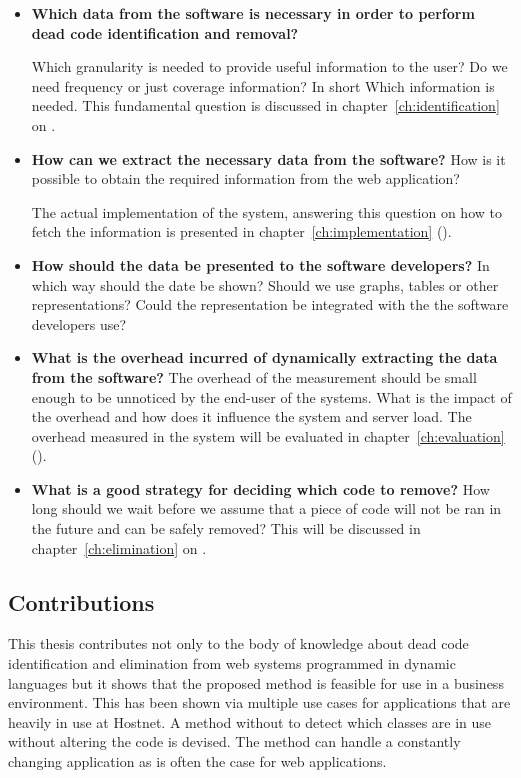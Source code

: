 \begin{itemize}
  \item 
  \textbf{Which data from the software is necessary in         order to perform dead code identification and removal?}  

  Which granularity is needed to provide useful information to the user? Do we need frequency or just coverage information? In short Which information is needed.  This fundamental question is discussed in chapter~\ref{ch:identification} on .
  
  \item 
	\textbf{How can we extract the necessary data from the software?}  
  	How is it possible to obtain the required information from the web application? 

	The actual implementation of the system, answering this question on how to fetch the information is presented in chapter~\ref{ch:implementation} ().
  
  
  \item
   \textbf{How should the data be presented to the software developers?} In which way should the date be shown? Should we use graphs, tables or other representations? Could the representation be integrated with the \ide the software developers use?
  \item
  	\textbf{What is the overhead incurred of dynamically extracting the data from the software?}
  	The overhead of the measurement should be small enough to be unnoticed by the end-user of the systems. What is the impact of the overhead and how does it influence the system and server load. The overhead measured in the system will be evaluated in chapter~\ref{ch:evaluation} ().
  \item 
  	\textbf{What is a good strategy for deciding which code to remove?}
  How long should we wait before we assume that a piece of code will not be ran in the future and can be safely removed? This will be discussed in chapter~\ref{ch:elimination} on .
\end{itemize}

\subsection*{Contributions}

This thesis contributes not only to the body of knowledge about dead code identification and elimination from web systems programmed in dynamic languages but it shows that the proposed method is feasible for use in a business environment. This has been shown via multiple use cases for applications that are heavily in use at Hostnet. A method without to detect which classes are in use without altering the code is devised. The method can handle a constantly changing application as is often the case for web applications. 

